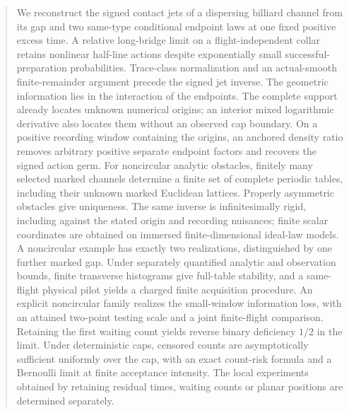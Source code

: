 \begin{abstract}
We reconstruct the signed contact jets of a dispersing billiard channel
from its gap and two same-type conditional endpoint laws at one fixed
positive excess time.  A relative long-bridge limit on a flight-independent
collar retains nonlinear half-line actions despite exponentially small
successful-preparation probabilities.  Trace-class normalization and an
actual-smooth finite-remainder argument precede the signed jet inverse.
The geometric information lies in the interaction of the endpoints.
The complete support already locates unknown numerical origins; an interior
mixed logarithmic derivative also locates them without an observed cap
boundary.  On a positive recording window containing the origins, an
anchored density ratio removes arbitrary positive separate endpoint factors
and recovers the signed action germ.  For noncircular analytic obstacles, finitely
many selected marked channels determine a finite set of complete periodic
tables, including their unknown marked Euclidean lattices.  Properly
asymmetric obstacles give uniqueness.  The same inverse is infinitesimally
rigid, including against the stated origin and recording nuisances;
finite scalar coordinates are obtained on immersed finite-dimensional
ideal-law models.  A noncircular example has exactly two realizations,
distinguished by one further marked gap.  Under separately quantified
analytic and observation bounds, finite transverse histograms give
full-table stability, and a same-flight physical pilot yields a charged
finite acquisition procedure.  An explicit noncircular family realizes the small-window information
loss, with an attained two-point testing scale and a joint finite-flight
comparison.  Retaining the first waiting count yields reverse binary deficiency
$1/2$ in the limit.  Under deterministic caps, censored counts are
asymptotically sufficient uniformly over the cap, with an exact count-risk
formula and a Bernoulli limit at finite acceptance intensity.
The local experiments obtained by retaining
residual times, waiting counts or planar positions are determined separately.
\end{abstract}
\makeatletter
\def\@setabstracta{%
  \ifvoid\abstractbox\else
    \skip@20\p@ \advance\skip@-\lastskip
    \advance\skip@-\baselineskip \vskip\skip@
    \unvbox\abstractbox \prevdepth\z@
  \fi}
\makeatother
\maketitle
\setcounter{tocdepth}{1}
\tableofcontents



